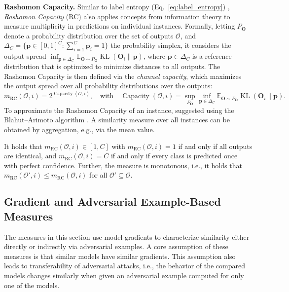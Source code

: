 \documentclass{article}
\newcommand{\citet}{\textcite}
\newcommand{\Out}{\bm{O}}
\newcommand{\E}{\mathbb{E}}
\newcommand\myeqref[1]{%
    (\textup{Eq.~\ref{#1}})%
}
\newcommand{\subheader}{\textbf}
\begin{document}
\subheader{Rashomon Capacity.}
Similar to label entropy \myeqref{eq:label_entropy}, \emph{Rashomon Capacity} (RC) \cite{hsu_rashomon_2022} also applies concepts from information theory to measure multiplicity in predictions on individual instances.
Formally, letting $P_{\bm{O}}$ denote a probability distribution over the set of outputs $\mathcal{O}$, and $\Delta_C= \big\{\bm{p}\in[0,1]^C : \textstyle\sum_{i=1}^C \bm{p}_i=1 \big\}$ the probability simplex, it considers the output spread
$\inf_{\bm{p}\in\Delta_C} \E_{\Out \sim P_{\bm{O}}} \operatorname{KL}(\Out_i\| \bm{p})$,
where $\bm{p}\in\Delta_C$ is a reference distribution that is optimized to minimize distances to all outputs.
The Rashomon Capacity is then defined via the \emph{channel capacity}, which maximizes the output spread over all probability distributions over the outputs:
\begin{equation}
    m_{\text{RC}}(\mathcal{O}, i) = 2^{\operatorname{Capacity}(\mathcal{O}, i)}, \quad\text{with}\quad \operatorname{Capacity}(\mathcal{O}, i) = \textstyle\sup_{P_{\bm{O}}}\textstyle\inf_{\bm{p}\in\Delta_C} \E_{\Out \sim P_{\bm{O}}} \operatorname{KL}(\Out_i\| \bm{p}).
\end{equation}
To approximate the Rashomon Capacity of an instance, \citet{hsu_rashomon_2022} suggested using the Blahut–Arimoto algorithm \cite{arimoto_algorithm_1972,blahut_computation_1972}.
A similarity measure over all instances can be obtained by aggregation, e.g., via the mean value.

It holds that $m_{\text{RC}}(\mathcal{O}, i)\in[1,C]$ with $m_{\text{RC}}(\mathcal{O}, i) = 1$ if and only if all outputs are identical, and $m_{\text{RC}}(\mathcal{O}, i) = C$ if and only if every class is predicted once with perfect confidence.
Further, the measure is monotonous, i.e., it holds that $m_{\text{RC}}(\mathcal{O}', i) \leq m_{\text{RC}}(\mathcal{O}, i)$ for all $\mathcal{O}'\subseteq \mathcal{O}$.



\subsection{Gradient and Adversarial Example-Based Measures}
The measures in this section use model gradients to characterize similarity either directly or indirectly via adversarial examples.
A core assumption of these measures is that similar models have similar gradients.
This assumption also leads to transferability of adversarial attacks, i.e., the behavior of the compared models changes similarly when given an adversarial example computed for only one of the models.
\end{document}
